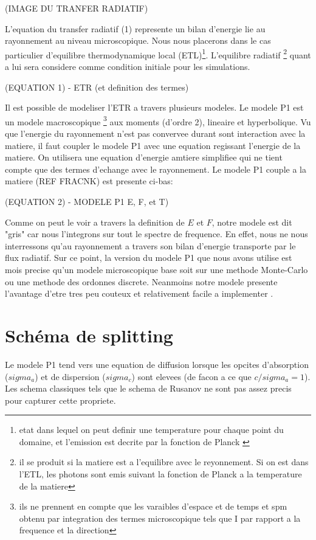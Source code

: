 (IMAGE DU TRANFER RADIATIF)

L'equation du transfer radiatif (1) represente un bilan d'energie lie au rayonnement au niveau microscopique. Nous nous placerons dans le cas particulier d'equilibre thermodynamique local (ETL)\footnote{etat dans lequel on peut definir une temperature pour chaque point du domaine, et l'emission est decrite par la fonction de Planck \parencite{Reference3}}. L'equilibre radiatif \footnote{il se produit si la matiere est a l'equilibre avec le reyonnement. Si on est dans l'ETL, les photons sont emis suivant la fonction de Planck a la temperature de la matiere} quant a lui sera considere comme condition initiale pour les simulations.

(EQUATION 1) - ETR (et definition des termes)

Il est possible de modeliser l'ETR a travers plusieurs modeles. Le modele P1 est un modele macroscopique \footnote{ils ne prennent en compte que les varaibles d'espace et de temps et spm obtenu par integration des termes microscopique tels que I par rapport a la frequence et la direction} aux moments (d'ordre 2), lineaire et hyperbolique. Vu que l'energie du rayonnement n'est pas convervee durant sont interaction avec la matiere, il faut coupler le modele P1 avec une equation regissant l'energie de la matiere. On utilisera une equation d'energie amtiere simplifiee qui ne tient compte que des termes d'echange avec le rayonnement. Le modele P1 couple a la matiere (REF FRACNK) est presente ci-bas:

(EQUATION 2) - MODELE P1  E, F, et T)

Comme on peut le voir a travers la definition de $E$ et $F$, notre modele est dit "gris" car nous l'integrons sur tout le spectre de frequence. En effet, nous ne nous interressons qu'au rayonnement a travers son bilan d'energie transporte par le flux radiatif. Sur ce point, la version du modele P1 que nous avons utilise est mois precise qu'un modele microscopique base soit sur une methode Monte-Carlo ou une methode des ordonnes discrete. Neanmoins notre modele presente l'avantage d'etre tres peu couteux et relativement facile a implementer \parencite{Reference3}. 

\section{Schéma de splitting}

Le modele P1 tend vers une equation de diffusion lorsque les opcites d'absorption ($sigma_a$) et de dispersion ($sigma_c$) sont elevees (de facon a ce que $c/sigma_a = 1$). Les schema classiques tels que le schema de Rusanov ne sont pas assez precis pour capturer cette propriete. 

